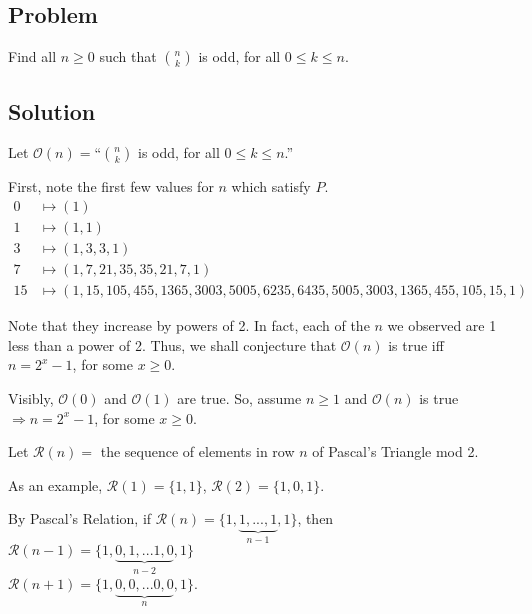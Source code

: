 \documentclass{article}
\newcommand{\pred}{\mathcal{O}}
\newcommand{\modrow}{\mathcal{R}}
\newcommand{\drawemptyrow}[4]{
    \node at (#2/4, #3/4) {#4};
    \node at (#2/-4, #3/4) {#4};
  }
\newcommand{\drawrow}[4]{
  \drawemptyrow{#1}{#2}{#3}{#4}
  \foreach \i in {0,...,#1}{
    \node at (#2/-4-\i/-2,#3/4){#4};
  }
}
\newcommand{\drawoddtriangle}[2]{
  \foreach \i in {0,...,7}{
    \drawemptyrow{\i}{#1+0+\i}{#2+7-\i}{1}
   }
   \drawrow{7}{#1+7}{#2+21}{1}
  }
\begin{document}
\begin{center}\item \section*{Problem}\end{center}

Find all $n \geq 0$ such that ${n \choose k}$ is odd, for all $0\leq k \leq n$.

\begin{center}\item \section*{Solution}\end{center}

Let $\pred(n) = $``${n \choose k}$ is odd, for all $0 \leq k \leq n$.''

First, note the first few values for $n$ which satisfy $P$.
\begin{align*}
  0 &\mapsto (1)\\
  1 &\mapsto (1,1)\\
  3 &\mapsto (1,3,3,1)\\
  7 &\mapsto (1,7,21,35,35,21,7,1)\\
  15 &\mapsto (1,15,105,455,1365,3003,5005,6235,6435,5005,3003,1365,455,105,15,1)
\end{align*}


Note that they increase by powers of 2. In fact, each of the $n$ we observed are 1 less than a power of 2. Thus, we shall conjecture that $\pred(n)$ is true iff $n = 2^x-1$, for some $x \geq 0$.

Visibly, $\pred(0)$ and $\pred(1)$ are true. So, assume $n \geq 1$ and $\pred(n)$ is true $\Rightarrow n = 2^x - 1$, for some $x \geq 0$.

Let $\modrow(n) = $ the sequence of elements in row $n$ of Pascal's Triangle mod 2.

As an example, $\modrow(1) = \{1,1\}$, $\modrow(2)= \{1,0,1\}$.

By Pascal's Relation, if $\modrow(n) = \{1,\underbrace{1,...,1}_{n-1},1\}$, 
then $\modrow(n-1) = \{1,\underbrace{0,1,...1,0}_{n-2},1\}$\\
     $\modrow(n+1) = \{1,\underbrace{0,0,...0,0}_{n},1\}$.

\begin{figure}[H]
\centering
{}
\end{figure}
\end{document}

